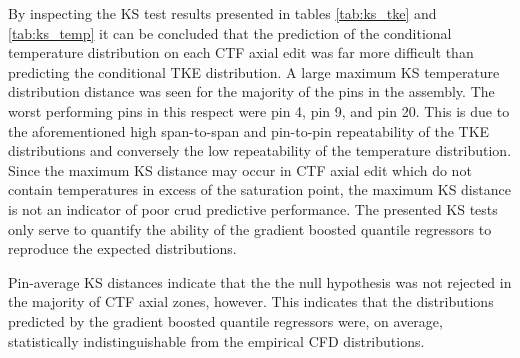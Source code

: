 By inspecting the KS test results presented in tables \ref{tab:ks_tke} and \ref{tab:ks_temp} it can be concluded that the prediction of the conditional temperature distribution on each CTF axial edit was far more difficult than predicting the conditional TKE distribution.  A large maximum KS temperature distribution distance was seen for the majority of the pins in the assembly. The worst performing pins in this respect were pin 4, pin 9, and pin 20. This is due to the aforementioned high span-to-span and pin-to-pin repeatability of the TKE distributions and conversely the low repeatability of the temperature distribution.  Since the maximum KS distance may occur in CTF axial edit which do not contain temperatures in excess of the saturation point, the maximum KS distance is not an indicator of poor crud predictive performance.  The presented KS tests only serve to quantify the ability of the gradient boosted quantile regressors to reproduce the expected distributions.

Pin-average KS distances indicate that the the null hypothesis was not rejected in the majority of CTF axial zones, however.  This indicates that the distributions predicted by the gradient boosted quantile regressors were, on average, statistically indistinguishable from the empirical CFD distributions. 

